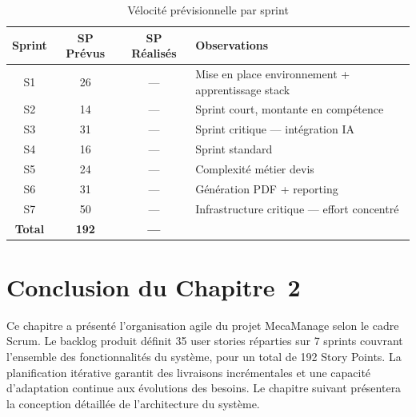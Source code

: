 \documentclass[12pt,a4paper]{report}
\begin{document}
\begin{table}[H]
\centering
\caption{V\'{e}locit\'{e} pr\'{e}visionnelle par sprint}
\renewcommand{\arraystretch}{1.3}
\begin{tabularx}{\textwidth}{|c|c|c|X|}
\hline
\rowcolor{primary!20}
\textbf{Sprint} & \textbf{SP Pr\'{e}vus} & \textbf{SP R\'{e}alis\'{e}s}
  & \textbf{Observations} \\
\hline
S1 & 26 & --- & Mise en place environnement + apprentissage stack \\
\hline
S2 & 14 & --- & Sprint court, montante en comp\'{e}tence \\
\hline
S3 & 31 & --- & Sprint critique --- int\'{e}gration IA \\
\hline
S4 & 16 & --- & Sprint standard \\
\hline
S5 & 24 & --- & Complexit\'{e} m\'{e}tier devis \\
\hline
S6 & 31 & --- & G\'{e}n\'{e}ration PDF + reporting \\
\hline
S7 & 50 & --- & Infrastructure critique --- effort concentr\'{e} \\
\hline
\rowcolor{lightgray}
\textbf{Total} & \textbf{192} & \textbf{---} & \\
\hline
\end{tabularx}
\end{table}

\section*{Conclusion du Chapitre~2}

Ce chapitre a pr\'{e}sent\'{e} l'organisation agile du projet MecaManage
selon le cadre Scrum. Le backlog produit d\'{e}finit 35 user stories
r\'{e}parties sur 7 sprints couvrant l'ensemble des fonctionnalit\'{e}s
du syst\`{e}me, pour un total de 192 Story Points. La planification
it\'{e}rative garantit des livraisons incr\'{e}mentales et une capacit\'{e}
d'adaptation continue aux \'{e}volutions des besoins. Le chapitre suivant
pr\'{e}sentera la conception d\'{e}taill\'{e}e de l'architecture du syst\`{e}me.
\end{document}
